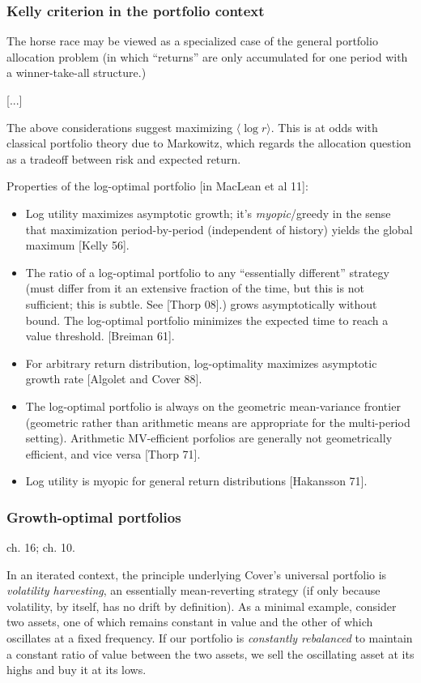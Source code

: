 \documentclass[notitlepage,openany,11pt]{report}
\theoremstyle{plain}%
\numberwithin{equation}{section}
\begin{document}
\subsubsection{Kelly criterion in the portfolio context}

The horse race may be viewed as a specialized case of the general portfolio allocation problem (in which ``returns'' are only accumulated for one period with a winner-take-all structure.)

[...]

The above considerations suggest maximizing $\langle \log r \rangle$. This is at odds with classical portfolio theory due to Markowitz, which regards the allocation question as a tradeoff between risk and expected return.  

Properties of the log-optimal portfolio [in MacLean et al 11]:
\begin{itemize}
\item Log utility maximizes asymptotic growth; it's \emph{myopic}/greedy in the sense that maximization period-by-period (independent of history) yields the global maximum [Kelly 56]. 
\item The ratio of a log-optimal portfolio to any ``essentially different'' strategy (must differ from it an extensive fraction of the time, but this is not sufficient; this is subtle. See [Thorp 08].) grows asymptotically without bound. The log-optimal portfolio minimizes the expected time to reach a value threshold. [Breiman 61].
\item For arbitrary return distribution, log-optimality maximizes asymptotic growth rate [Algolet and Cover 88].
\item The log-optimal portfolio is always on the geometric mean-variance frontier (geometric rather than arithmetic means are appropriate for the multi-period setting). Arithmetic MV-efficient porfolios are generally not geometrically efficient, and vice versa [Thorp 71].
\item Log utility is myopic for general return distributions [Hakansson 71].
\end{itemize}


\subsubsection{Growth-optimal portfolios} \cite{CoverThomas:91} ch. 16; \cite{Cesa-BianchiLugosi:06} ch. 10.


In an iterated context, the principle underlying Cover's universal portfolio is \emph{volatility harvesting}, an essentially mean-reverting strategy (if only because volatility, by itself, has no drift by definition). As a minimal example, consider two assets, one of which remains constant in value and the other of which oscillates at a fixed frequency. If our portfolio is \emph{constantly rebalanced} to maintain a constant ratio of value between the two assets, we sell the oscillating asset at its highs and buy it at its lows.
\end{document}
